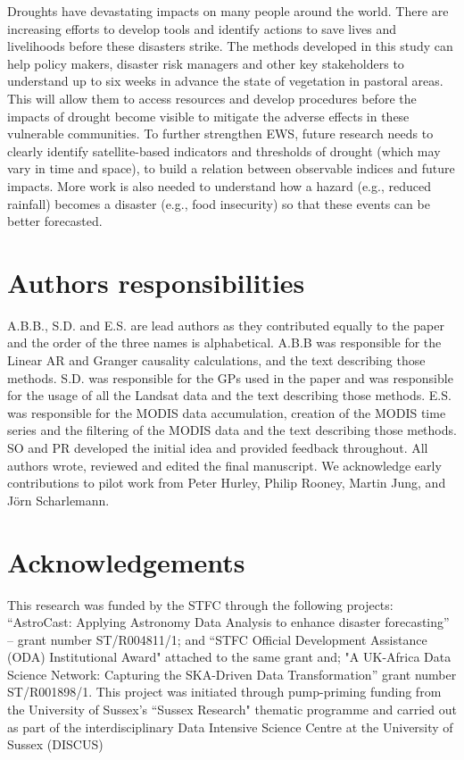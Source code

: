 \documentclass[review]{elsarticle}
\begin{document}
Droughts have devastating impacts on many people around the world. There are increasing efforts to develop tools and identify actions to save lives and livelihoods before these disasters strike. The methods developed in this study can help policy makers, disaster risk managers and other key stakeholders to understand up to six weeks in advance the state of vegetation in pastoral areas. This will allow them to access resources and develop procedures before the impacts of drought become visible to mitigate the adverse effects in these vulnerable communities. To further strengthen EWS, future research needs to clearly identify satellite-based indicators and thresholds of drought (which may vary in time and space), to build a relation between observable indices and future impacts. More work is also needed to understand how a hazard (e.g., reduced rainfall) becomes a disaster (e.g., food insecurity) so that these events can be better forecasted.




\section*{Authors responsibilities}
A.B.B., S.D. and E.S. are lead authors as they contributed equally to the paper and the order of the three names is alphabetical. A.B.B was responsible for the Linear AR and Granger causality calculations, and the text describing those methods. S.D. was responsible for the GPs used in the paper and was responsible for the usage of all the Landsat data and the text describing those methods. E.S. was responsible for the MODIS data accumulation, creation of the MODIS time series and the filtering of the MODIS data and the text describing those methods. SO and PR developed the initial idea and provided feedback throughout. All authors wrote, reviewed and edited the final manuscript. We acknowledge early contributions to pilot work from Peter Hurley, Philip Rooney, Martin Jung, and J\"{o}rn Scharlemann.

\section*{Acknowledgements}
This research was funded by the STFC through the following projects: ``AstroCast: Applying Astronomy Data Analysis to enhance disaster forecasting'' -- grant number ST/R004811/1; and ``STFC Official Development Assistance (ODA) Institutional Award" attached to the same grant and; "A UK-Africa Data Science Network: Capturing the SKA-Driven Data Transformation'' grant number ST/R001898/1. This project was initiated through pump-priming funding from the University of Sussex's ``Sussex Research" thematic programme and carried out as part of the interdisciplinary Data Intensive Science Centre at the University of Sussex (DISCUS)
\end{document}
